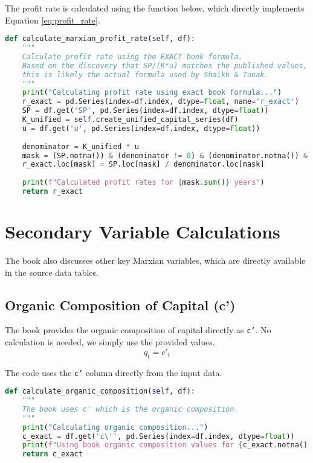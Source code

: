 \documentclass[12pt,a4paper]{article}
\begin{document}
\begin{tcolorbox}[colback=red!5!white,colframe=red!75!black,title=Implementation for Equation \ref{eq:profit_rate}]
The profit rate is calculated using the function below, which directly implements Equation \ref{eq:profit_rate}.
\begin{lstlisting}[language=Python, caption=Profit Rate Calculation, label=code:profit_rate]
def calculate_marxian_profit_rate(self, df):
    """
    Calculate profit rate using the EXACT book formula.
    Based on the discovery that SP/(K*u) matches the published values,
    this is likely the actual formula used by Shaikh & Tonak.
    """
    print("Calculating profit rate using exact book formula...")
    r_exact = pd.Series(index=df.index, dtype=float, name='r_exact')
    SP = df.get('SP', pd.Series(index=df.index, dtype=float))
    K_unified = self.create_unified_capital_series(df)
    u = df.get('u', pd.Series(index=df.index, dtype=float))
    
    denominator = K_unified * u
    mask = (SP.notna()) & (denominator != 0) & (denominator.notna()) & (u.notna())
    r_exact.loc[mask] = SP.loc[mask] / denominator.loc[mask]
    
    print(f"Calculated profit rates for {mask.sum()} years")
    return r_exact
\end{lstlisting}
\end{tcolorbox}

\section{Secondary Variable Calculations}
The book also discusses other key Marxian variables, which are directly available in the source data tables.

\subsection{Organic Composition of Capital (c')}
The book provides the organic composition of capital directly as \texttt{c'}. No calculation is needed, we simply use the provided values.
\begin{equation}
q_t = c'_t 
\end{equation}

\begin{tcolorbox}[colback=orange!5!white,colframe=orange!75!black,title=Implementation for Organic Composition]
The code uses the \texttt{c'} column directly from the input data.
\begin{lstlisting}[language=Python, caption=Organic Composition of Capital, label=code:organic_composition]
def calculate_organic_composition(self, df):
    """
    The book uses c' which is the organic composition.
    """
    print("Calculating organic composition...")
    c_exact = df.get('c\'', pd.Series(index=df.index, dtype=float))
    print(f"Using book organic composition values for {c_exact.notna().sum()} years")
    return c_exact
\end{lstlisting}
\end{tcolorbox}
\end{document}
